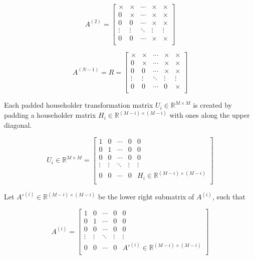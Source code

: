 \documentclass{article}
\begin{document}
\begin{equation}
A^{(2)} =
\begin{bmatrix}
\times & \times & \cdots & \times & \times\\
0 & \times  & \cdots & \times & \times\\
0 & 0 & \cdots & \times & \times\\
\vdots & \vdots  & \ddots & \vdots & \vdots\\
0 & 0  & \cdots & \times & \times\\
\end{bmatrix}
\end{equation}

\begin{equation}
A^{(N-1)} = R =
\begin{bmatrix}
\times & \times & \cdots & \times & \times\\
0 & \times  & \cdots & \times & \times\\
0 & 0 & \cdots & \times & \times\\
\vdots & \vdots  & \ddots & \vdots & \vdots\\
0 & 0  & \cdots & 0 & \times\\
\end{bmatrix}
\end{equation}

Each padded householder transformation matrix $U_{i}\in\mathbb{R}^{M\times{}M}$ is created by padding a householder matrix $H_{i}\in\mathbb{R}^{(M-i)\times{}(M-i)}$ with ones along the upper diagonal.

\begin{equation}
U_{i}\in\mathbb{R}^{M\times{}M} =
\begin{bmatrix}
1 & 0 & \cdots & 0  & 0\\
0 & 1  & \cdots & 0 & 0\\
0 & 0 & \cdots & 0 & 0\\
\vdots & \vdots  & \ddots & \vdots & \vdots\\
0 & 0  & \cdots & 0 & H_{i}\in\mathbb{R}^{(M-i)\times{}(M-i)}\\
\end{bmatrix}
\end{equation}

Let $A'^{(i)}\in\mathbb{R}^{(M-i)\times{}(M-i)}$ be the lower right submatrix of $A^{(i)}$, such that

\begin{equation}
A^{(i)} =
\begin{bmatrix}
1 & 0 & \cdots & 0  & 0\\
0 & 1  & \cdots & 0 & 0\\
0 & 0 & \cdots & 0 & 0\\
\vdots & \vdots  & \ddots & \vdots & \vdots\\
0 & 0  & \cdots & 0 & A'^{(i)}\in\mathbb{R}^{(M-i)\times{}(M-i)}\\
\end{bmatrix}
\end{equation}
\end{document}
